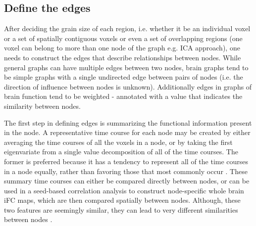 \subsection{Define the edges}

After deciding the grain size of each region, i.e. whether it be an individual voxel or a set of spatially contiguous voxels or even a set of overlapping regions (one voxel can belong to more than one node of the graph e.g. ICA approach), one needs to construct the edges that describe relationships between nodes. While general graphs can have multiple edges between two nodes, brain graphs tend to be simple graphs with a single undirected edge between pairs of nodes (i.e. the direction of influence between nodes is unknown). Additionally edges in graphs of brain function tend to be weighted - annotated with a value that indicates the similarity between nodes. 

The first step in defining edges is summarizing the functional information present in the node. A representative time course for each node may be created by either averaging the time courses of all the voxels in a node, or by taking the first eigenvariate from a single value decomposition of all of the time courses\cite{friston_functional_localizers}. The former is preferred because it has a tendency to represent all of the time courses in a node equally, rather than favoring those that most commonly occur \cite{craddock2012}. These summary time courses can either be compared directly between nodes, or can be used in a seed-based correlation analysis to construct node-specific whole brain iFC maps, which are then compared spatially between nodes. Although, these two features are seemingly similar, they can lead to very different similarities between nodes \cite{craddock2012}. 

